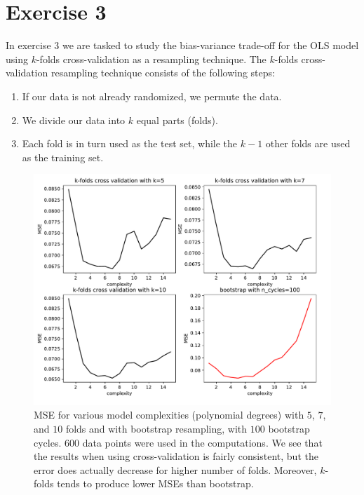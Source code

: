 \documentclass[10pt, a4paper]{article}
\begin{document}
\section*{Exercise 3}
    
    In exercise $3$ we are tasked to study the bias-variance trade-off for the OLS model using $k$-folds cross-validation as a resampling technique. The $k$-folds cross-validation resampling technique consists of the following steps:
    \begin{enumerate}
        \item If our data is not already randomized, we permute the data.
        \item We divide our data into $k$ equal parts (folds).
        \item Each fold is in turn used as the test set, while the \(k-1\) other folds are used as the training set.
    \end{enumerate}
    
    \begin{figure}[h]
        \centering
        \includegraphics[scale=0.6]{ex3_cv_bs_n_600_noise_0.25.pdf}
        \caption{MSE for various model complexities (polynomial degrees) with $5$, $7$, and $10$ folds and with bootstrap resampling, with $100$ bootstrap cycles. $600$ data points were used in the computations. We see that the results when using cross-validation is fairly consistent, but the error does actually decrease for higher number of folds. Moreover, $k$-folds tends to produce lower MSEs than bootstrap.}
        \label{fig:ex3-1}
    \end{figure}
    
\end{document}
